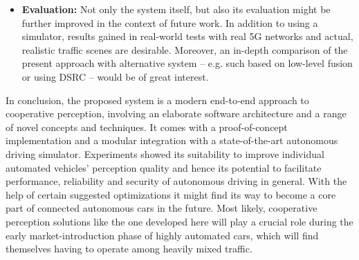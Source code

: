 \begin{itemize}
	\item \textbf{Evaluation:} Not only the system itself, but also its evaluation might be further improved in the context of future work. In addition to using a simulator, results gained in real-world tests with real 5G networks and actual, realistic traffic scenes are desirable. Moreover, an in-depth comparison of the present approach with alternative system – e.g. such based on low-level fusion or using DSRC – would be of great interest.
\end{itemize}
\par
\bigskip

In conclusion, the proposed system is a modern end-to-end approach to cooperative perception, involving an elaborate software architecture and a range of novel concepts and techniques. It comes with a proof-of-concept implementation and a modular integration with a state-of-the-art autonomous driving simulator. Experiments showed its suitability to improve individual automated vehicles' perception quality and hence its potential to facilitate performance, reliability and security of autonomous driving in general. With the help of certain suggested optimizations it might find its way to become a core part of connected autonomous cars in the future. Most likely, cooperative perception solutions like the one developed here will play a crucial role during the early market-introduction phase of highly automated cars, which will find themselves having to operate among heavily mixed traffic. 